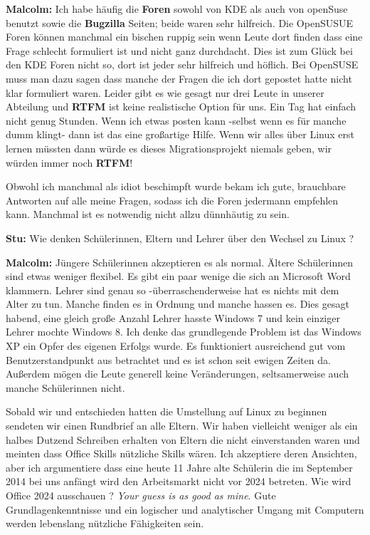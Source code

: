 \documentclass[10pt,a4paper,ngerman,twoside]{article} %
\begin{document}
\textbf{Malcolm:} Ich habe häufig die \textbf{Foren} sowohl von KDE als auch von openSuse benutzt sowie die \textbf{Bugzilla} Seiten; beide waren sehr hilfreich. Die OpenSUSUE Foren können manchmal ein bischen ruppig sein wenn Leute dort finden dass eine Frage schlecht formuliert ist und nicht ganz durchdacht. Dies ist zum Glück bei den KDE Foren nicht so, dort ist jeder sehr hilfreich und höflich. Bei OpenSUSE muss man dazu sagen dass manche der Fragen die ich dort gepostet hatte nicht klar formuliert waren. Leider gibt es wie gesagt nur drei Leute in unserer Abteilung und \textbf{RTFM} ist keine realistische Option für uns. Ein Tag hat einfach nicht genug Stunden. Wenn ich etwas posten kann -selbst wenn es für manche dumm klingt- dann ist das eine großartige Hilfe. Wenn wir alles über Linux erst lernen müssten dann würde es dieses Migrationsprojekt niemals geben, wir würden immer noch \textbf{RTFM}!

Obwohl ich manchmal als idiot beschimpft wurde bekam ich gute, brauchbare Antworten auf alle meine Fragen, sodass ich die Foren jedermann empfehlen kann. Manchmal ist es notwendig nicht allzu dünnhäutig zu sein.

\textbf{Stu:} Wie denken Schülerinnen, Eltern und Lehrer über den Wechsel zu Linux ?


\textbf{Malcolm:} Jüngere Schülerinnen akzeptieren es als normal. Ältere Schülerinnen sind etwas weniger flexibel. Es gibt ein paar wenige die sich an Microsoft Word klammern. Lehrer sind genau so -überraschenderweise hat es nichts mit dem Alter zu tun. Manche finden es in Ordnung und manche hassen es. Dies gesagt habend, eine gleich große Anzahl Lehrer hasste Windows 7 und kein einziger Lehrer mochte Windows 8. Ich denke das grundlegende Problem ist das Windows XP ein Opfer des eigenen Erfolgs wurde. Es funktioniert ausreichend gut vom Benutzerstandpunkt aus betrachtet und es ist schon seit ewigen Zeiten da. Außerdem mögen die Leute generell keine Veränderungen, seltsamerweise auch manche Schülerinnen nicht. 

Sobald wir und entschieden hatten die Umstellung auf Linux zu beginnen sendeten wir einen Rundbrief an alle Eltern. Wir haben vielleicht weniger als ein halbes Dutzend Schreiben erhalten von Eltern die nicht einverstanden waren und meinten dass Office Skills nützliche Skills wären. Ich akzeptiere deren Ansichten, aber ich argumentiere dass eine heute 11 Jahre alte Schülerin die im September 2014 bei uns anfängt wird den Arbeitsmarkt nicht vor 2024 betreten. Wie wird Office 2024 ausschauen ? \emph{Your guess is as good as mine}. Gute Grundlagenkenntnisse und ein logischer und analytischer Umgang mit Computern werden lebenslang nützliche Fähigkeiten sein.
\end{document}
